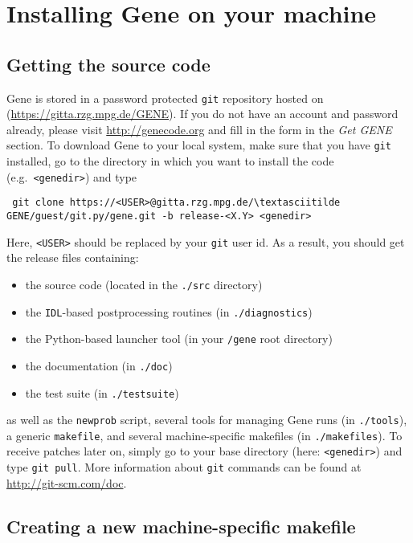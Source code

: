 \documentclass[12pt]{article}
\begin{document}
\newpage

\section{Installing Gene on your machine}

\subsection{Getting the source code}

{\sc Gene} is stored in a password protected {\tt git} repository hosted on
(\url{https://gitta.rzg.mpg.de/GENE}). If you do not have an account and password already,
please visit \url{http://genecode.org} and fill in the form in the {\em Get GENE} section.
To download {\sc Gene} to your local system, make sure that you have {\tt git} installed, go to the
directory in which you want to install the code (e.g.~\texttt{<genedir>}) and type
\begin{verbatim}
 git clone https://<USER>@gitta.rzg.mpg.de/\textasciitilde GENE/guest/git.py/gene.git -b release-<X.Y> <genedir>
\end{verbatim}
Here, {\tt <USER>} should be replaced by your {\tt git} user id. As a result, you should get the release files containing:
\begin{itemize}
\item the \gene source code (located in the \texttt{./src} directory)
\item the {\tt IDL}-based postprocessing routines (in \texttt{./diagnostics})
\item the Python-based launcher tool (in your \texttt{/gene} root directory)
\item the \gene documentation (in \texttt{./doc})
\item the \gene test suite (in \texttt{./testsuite})
\end{itemize}
as well as the {\tt newprob} script, several tools for managing {\sc Gene} runs (in \texttt{./tools}),
a generic {\tt makefile}, and several machine-specific makefiles (in \texttt{./makefiles}).
To receive patches later on, simply go to your \gene base directory (here: \texttt{<genedir>}) and type
\verb|git pull|. More information about {\tt git} commands can be found at \\
\url{http://git-scm.com/doc}.

\subsection{Creating a new machine-specific makefile}
\end{document}
